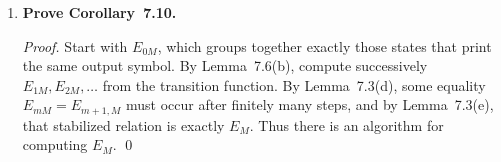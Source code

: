 \begin{enumerate}[{7.}1.]
\begin{enumerate}[(a)]
\begin{proof}
  \emph{Step:} Let $x=\pmb{a}y$.  Then
  \[
    \mu(\DBAR_A(s,\pmb{a}y))
    =\mu(\DBAR_A(\delta_A(s,\pmb{a}),y))
    =\DBAR_B(\mu(\delta_A(s,\pmb{a})),y),
  \]
  where the last equality is the inductive hypothesis.  By the homomorphism
  property,
  \[
    \DBAR_B(\mu(\delta_A(s,\pmb{a})),y)
    =\DBAR_B(\delta_B(\mu(s),\pmb{a}),y)
    =\DBAR_B(\mu(s),\pmb{a}y).
  \]
  \end{proof}

  \item $(\forall s \in S_A)(\forall x \in \Sigma^*)(\OBAR_A(s,x)=
  \OBAR_B(\mu(s),x))$.

  \begin{proof}
  By induction on $|x|$.

  \emph{Base:} If $x=\lambda$, then both sides equal $\lambda$.

  \emph{Step:} Let $x=\pmb{a}y$.  By Definition~7.17,
  \[
    \OBAR_A(s,\pmb{a}y)
    =\omega_A(\delta_A(s,\pmb{a}))\cdot\OBAR_A(\delta_A(s,\pmb{a}),y).
  \]
  Since $\mu$ is a Moore homomorphism,
  \[
    \omega_A(\delta_A(s,\pmb{a}))
    =\omega_B(\mu(\delta_A(s,\pmb{a})))
    =\omega_B(\delta_B(\mu(s),\pmb{a})).
  \]
  Applying the inductive hypothesis to the state $\delta_A(s,\pmb{a})$ gives
  \[
    \OBAR_A(s,\pmb{a}y)
    =\omega_B(\delta_B(\mu(s),\pmb{a}))\cdot
      \OBAR_B(\delta_B(\mu(s),\pmb{a}),y)
    =\OBAR_B(\mu(s),\pmb{a}y).
  \]
  \end{proof}

  \item $A\equiv B$:

  \begin{proof}
  Taking $s=s_{0_A}$ in part~(b), and using $\mu(s_{0_A})=s_{0_B}$, we obtain
  \[
    \OBAR_A(s_{0_A},x)=\OBAR_B(s_{0_B},x)
  \]
  for every $x\in\Sigma^*$.  Hence $f_A=f_B$.
  \end{proof}
\end{enumerate}

\item \textbf{Prove Corollary~7.10.}

\begin{proof}
Start with $E_{0M}$, which groups together exactly those states that print the
same output symbol.  By Lemma~7.6(b), compute successively
$E_{1M},E_{2M},\ldots$ from the transition function.  By Lemma~7.3(d), some
equality $E_{mM}=E_{m+1,M}$ must occur after finitely many steps, and by
Lemma~7.3(e), that stabilized relation is exactly $E_M$.  Thus there is an
algorithm for computing $E_M$. \qed
\end{proof}


\end{enumerate}
